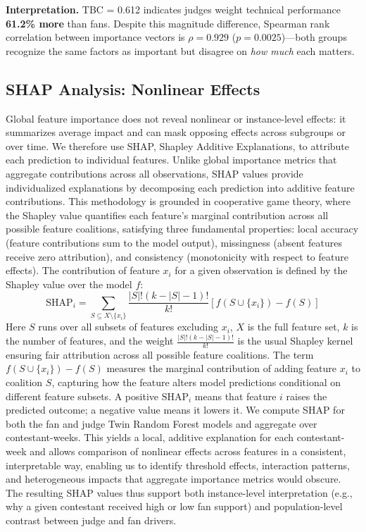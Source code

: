 \documentclass{mcmthesis}
\begin{document}
\textbf{Interpretation.} TBC = 0.612 indicates judges weight technical performance \textbf{61.2\% more} than fans. Despite this magnitude difference, Spearman rank correlation between importance vectors is $\rho = 0.929$ ($p = 0.0025$)---both groups recognize the same factors as important but disagree on \textit{how much} each matters.

\subsection{SHAP Analysis: Nonlinear Effects}

Global feature importance does not reveal nonlinear or instance-level effects: it summarizes average impact and can mask opposing effects across subgroups or over time. We therefore use SHAP, Shapley Additive Explanations, to attribute each prediction to individual features. Unlike global importance metrics that aggregate contributions across all observations, SHAP values provide individualized explanations by decomposing each prediction into additive feature contributions. This methodology is grounded in cooperative game theory, where the Shapley value quantifies each feature's marginal contribution across all possible feature coalitions, satisfying three fundamental properties: local accuracy (feature contributions sum to the model output), missingness (absent features receive zero attribution), and consistency (monotonicity with respect to feature effects). The contribution of feature $x_i$ for a given observation is defined by the Shapley value over the model $f$:
\begin{equation}\label{eq:shap_single}
\text{SHAP}_i = \sum_{S \subseteq X \setminus \{x_i\}} \frac{|S|! (k - |S| - 1)!}{k!} \left[ f(S \cup \{x_i\}) - f(S) \right]
\end{equation}
Here $S$ runs over all subsets of features excluding $x_i$, $X$ is the full feature set, $k$ is the number of features, and the weight $\frac{|S|! (k - |S| - 1)!}{k!}$ is the usual Shapley kernel ensuring fair attribution across all possible feature coalitions. The term $f(S \cup \{x_i\}) - f(S)$ measures the marginal contribution of adding feature $x_i$ to coalition $S$, capturing how the feature alters model predictions conditional on different feature subsets. A positive $\text{SHAP}_i$ means that feature $i$ raises the predicted outcome; a negative value means it lowers it. We compute SHAP for both the fan and judge Twin Random Forest models and aggregate over contestant-weeks. This yields a local, additive explanation for each contestant-week and allows comparison of nonlinear effects across features in a consistent, interpretable way, enabling us to identify threshold effects, interaction patterns, and heterogeneous impacts that aggregate importance metrics would obscure. The resulting SHAP values thus support both instance-level interpretation (e.g., why a given contestant received high or low fan support) and population-level contrast between judge and fan drivers.
\end{document}
